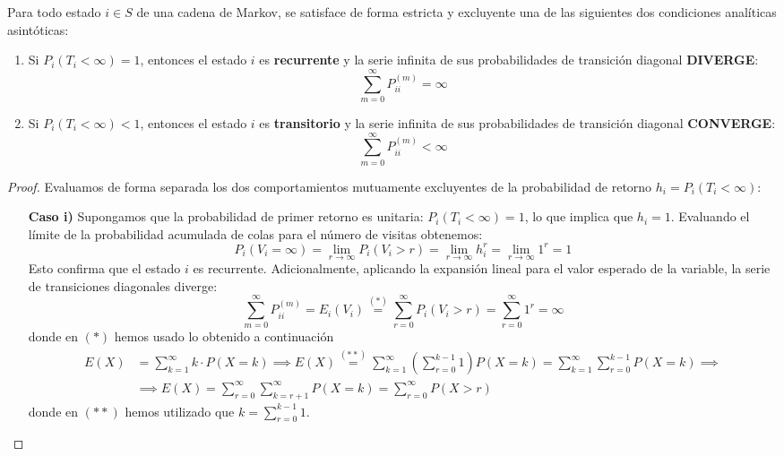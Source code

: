 \documentclass[10pt]{book}
\begin{document}
\begin{teo}
    Para todo estado $i \in S$ de una cadena de Markov, se satisface de forma estricta y excluyente una de las siguientes dos condiciones analíticas asintóticas:
    \begin{enumerate}
        \item Si $P_i(T_i < \infty) = 1$, entonces el estado $i$ es \textbf{recurrente} y la serie infinita de sus probabilidades de transición diagonal \textbf{DIVERGE}:
        \[
        \sum_{m=0}^{\infty} P_{ii}^{(m)} = \infty
        \]
        \item Si $P_i(T_i < \infty) < 1$, entonces el estado $i$ es \textbf{transitorio} y la serie infinita de sus probabilidades de transición diagonal \textbf{CONVERGE}:
        \[
        \sum_{m=0}^{\infty} P_{ii}^{(m)} < \infty
        \]
    \end{enumerate}

\begin{proof}
    Evaluamos de forma separada los dos comportamientos mutuamente excluyentes de la probabilidad de retorno $h_i = P_i(T_i < \infty)$:
    \begin{itemize}
        \item[\textbf{Caso i)}] Supongamos que la probabilidad de primer retorno es unitaria: $P_i(T_i < \infty) = 1$, lo que implica que $h_i = 1$. Evaluando el límite de la probabilidad acumulada de colas para el número de visitas obtenemos:
        \[ 
        P_i(V_i = \infty) = \lim_{r \to \infty} P_i(V_i > r) = \lim_{r \to \infty} h_i^r = \lim_{r \to \infty} 1^r = 1 
        \]
        Esto confirma que el estado $i$ es recurrente. Adicionalmente, aplicando la expansión lineal para el valor esperado de la variable, la serie de transiciones diagonales diverge:
        \[
        \sum_{m=0}^{\infty} P_{ii}^{(m)} = E_i(V_i) \overset{(*)}{=} \sum_{r=0}^{\infty} P_i(V_i > r) = \sum_{r=0}^{\infty} 1^r = \infty
        \]
        donde en $(*)$ hemos usado lo obtenido a continuación
        \begin{align*}
            E(X)& = \sum_{k=1}^{\infty} k \cdot P(X = k) \implies E(X) \overset{(**)}{=} \sum_{k=1}^{\infty} \left( \sum_{r=0}^{k-1} 1 \right) P(X = k) = \sum_{k=1}^{\infty} \sum_{r=0}^{k-1} P(X = k) \implies \\
            & \implies E(X) = \sum_{r=0}^{\infty} \sum_{k=r+1}^{\infty} P(X = k)= \sum_{r=0}^{\infty} P(X > r)
        \end{align*}
        donde en $(**)$ hemos utilizado que $k=\sum\limits_{r=0}^{k-1} 1$.
        

\end{itemize}
\end{proof}
\end{teo}
\end{document}

